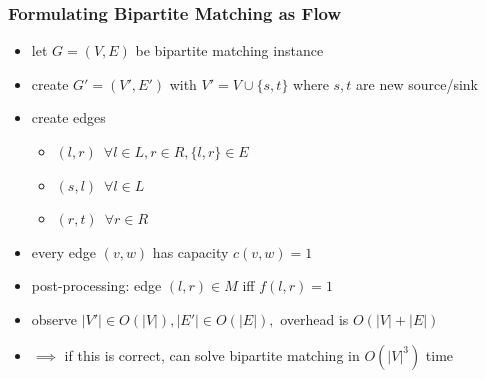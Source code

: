 \documentclass{beamer}
\begin{document}
\begin{frame} \frametitle{Formulating Bipartite Matching as Flow}
\begin{itemize}
  \item let $G=(V, E)$ be bipartite matching instance
  \item create $G'=(V', E')$ with $V' = V \cup \{s, t\}$ where $s, t$ are new
    source/sink
  \item create edges
  \begin{itemize}
    \item $(l, r) \enspace \forall l \in L, r \in R, \{l, r\} \in E$
    \item $(s, l) \enspace \forall l \in L$
    \item $(r, t) \enspace \forall r \in R$
  \end{itemize}
  \item every edge $(v, w)$ has capacity $c(v, w)=1$
  \item post-processing: edge $(l, r) \in M$ iff $f(l, r)=1$
  \item observe $|V'| \in O(|V|), |E'| \in O(|E|),$ overhead is $O(|V|+|E|)$
  \item $\implies$ if this is correct, can solve bipartite matching in $O(|V|^3)$ time
\end{itemize}
\end{frame}
\end{document}
